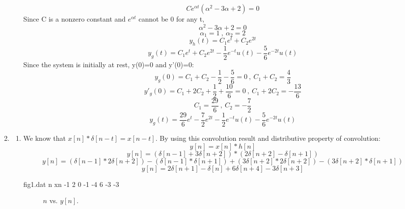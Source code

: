 \documentclass[10pt,a4paper, margin=1in]{article}
\begin{document}
\begin{enumerate}
\begin{enumerate}
     \[Ce^{\alpha t}(\alpha^2-3\alpha+2)=0\]
     Since C is a nonzero constant and $e^{\alpha t}$ cannot be 0 for any t,
     \[\alpha^2-3\alpha+2=0\]
     \[\alpha_1=1 \ , \ \alpha_2=2\]
    \[y_h(t)=C_1e^{t} + C_2e^{2t} \]
     \[y_g(t)=C_1e^{t} + C_2e^{2t}  -\frac{1}{2}e^{-t}u(t) -\frac{5}{6}e^{-2t}u(t)\]
     Since the system is initially at rest, y(0)=0 and y'(0)=0:\\
     \[y_g(0)=C_1 + C_2  -\frac{1}{2} -\frac{5}{6}=0 \ ,  \ C_1+C_2= \frac{4}{3}\]
     \[y'_g(0)=C_1 + 2C_2  +\frac{1}{2} +\frac{10}{6}=0 \ ,  \ C_1+2C_2= -\frac{13}{6}\]
     \[C_1=\frac{29}{6} \ , \ C_2=-\frac{7}{2}\]
     \[y_g(t)=\frac{29}{6}e^{t} - \frac{7}{2}e^{2t}  -\frac{1}{2}e^{-t}u(t) -\frac{5}{6}e^{-2t}u(t)\]
    \end{enumerate}

\item %
    \begin{enumerate}
    \item We know that $x[n] \ast \delta[n-t] = x[n-t]$. By using this convolution result and distributive property of convolution:
    \[y[n] = x[n] \ast h[n]\]
    \[y[n] = (\delta[n-1] + 3\delta[n+2]) \ast (2\delta[n+2] - \delta[n+1])\]
    \[y[n] = (\delta[n-1] \ast 2\delta[n+2]) - (\delta[n-1] \ast \delta[n+1]) + (3\delta[n+2] \ast 2\delta[n+2]) - (3\delta[n+2] \ast \delta[n+1])\]
    \[y[n] = 2\delta[n+1] - \delta[n] + 6\delta[n+4] - 3\delta[n+3]\]
    
    \begin{filecontents}{fig1.dat}
    n   xn
    -1 2
    0 -1
    -4  6
    -3  -3
    \end{filecontents}

     \begin{figure}[H]
     \centering
     \caption{$n$ vs. $y[n]$.}
     \label{fig:fig1}
     \end{figure}
    

\end{enumerate}
\end{enumerate}
\end{document}
